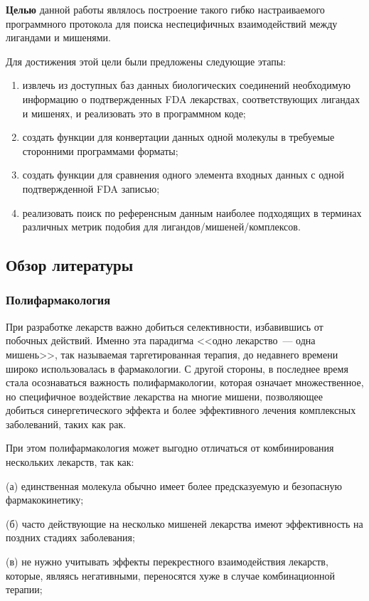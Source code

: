 \documentclass[a4paper,14pt]{article}         %
\begin{document}
\textbf{Целью} данной работы являлось построение такого гибко настраиваемого программного протокола для поиска неспецифичных взаимодействий между лигандами и мишенями. 

Для достижения этой цели были предложены следующие этапы:
\begin{enumerate}
	\item извлечь из доступных баз данных биологических соединений необходимую информацию о подтвержденных FDA лекарствах, соответствующих лигандах и мишенях, и реализовать это в программном коде;
	\item создать функции для конвертации данных одной молекулы в требуемые сторонними программами форматы;
	\item создать функции для сравнения одного элемента входных данных с одной подтвержденной FDA записью;
	\item реализовать поиск по референсным данным наиболее подходящих в терминах различных метрик подобия для лигандов/мишеней/комплексов.
\end{enumerate}

\subsection{Обзор литературы}
\subsubsection{Полифармакология}
При разработке лекарств важно добиться селективности, избавившись от побочных действий. Именно эта парадигма <<одно лекарство~--- одна мишень>>, так называемая таргетированная терапия, до недавнего времени широко использовалась в фармакологии. С другой стороны, в последнее время стала осознаваться важность полифармакологии, которая означает множественное, но специфичное воздействие лекарства на многие мишени, позволяющее добиться синергетического эффекта и более эффективного лечения комплексных заболеваний, таких как рак\cite{Anighoro2014}. 

При этом полифармакология может выгодно отличаться от комбинирования нескольких лекарств, так как:

(а) единственная молекула обычно имеет более предсказуемую и безо\-пасную фармакокинетику; 

(б) часто действующие на несколько мишеней лекарства имеют  эффективность на поздних стадиях заболевания; 

(в) не нужно учитывать эффекты перекрестного взаимодействия лекарств, которые, являясь негативными, переносятся хуже в случае комбинационной терапии; 
\end{document}
